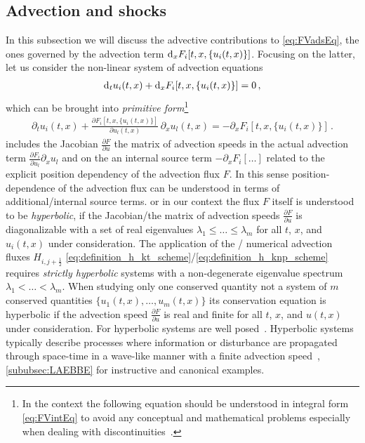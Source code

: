 \subsection{Advection and shocks}\label{subsec:hydroAdvection}
In this subsection we will discuss the advective contributions to \cref{eq:FVadsEq}, \viz{} the ones governed by the advection term $\difx\! F_i [ t, x, \{u_i ( t, x )\} ]$.
Focusing on the latter, let us consider the non-linear system of advection equations
\begin{align}
	\dift\! u_i ( t, x )+\difx\!  F_i [ t, x, \{u_i ( t, x )\} ]=0\,,\label{eq:FVadsEqFonly}
\end{align}
which can be brought into \textit{primitive form}\footnote{
	In the \fv{} context the following equation should be understood in integral form \eqref{eq:FVintEq} to avoid any conceptual and mathematical problems especially when dealing with discontinuities~\cite{LeVeque:2002,RezzollaZanotti:2013,Vazquez-Cendon2015}.
}
\begin{align}
	\partial_t u_i ( t, x )+\frac{\partial F_i[ t, x, \{u_i ( t, x )\} ]}{\partial u_l(t,x)}\,\partial_x u_l ( t, x ) = -\partial_x F_i [ t, x, \{u_i ( t, x )\} ] \,.\label{eq:FVFprimitive}
\end{align}
 includes the Jacobian $\frac{\partial F}{\partial u}$ \dash{} the matrix of advection speeds \dash{} in the actual advection term $\frac{\partial F_i}{\partial u_l}\partial_x u_l$ and on the \rhs{} an internal source term $-\partial_x F_i[\ldots]$ related to the explicit position dependency of the advection flux $F$.
In this sense position-dependence of the advection flux can be understood in terms of additional/internal source terms.
 or in our context the flux $F$ itself is understood to be \textit{hyperbolic}, if the Jacobian/the matrix of advection speeds $\frac{\partial F}{\partial u}$ is diagonalizable with a set of real eigenvalues $\lambda_1 \le \ldots \le \lambda_m$ for all $t$, $x$, and $u_i ( t, x )$ under consideration.
The application of the \kt{}/\knp{} numerical advection fluxes $H_{i,j + \frac{1}{2}}$ \eqref{eq:definition_h_kt_scheme}/\eqref{eq:definition_h_knp_scheme} requires \textit{strictly hyperbolic} systems with a non-degenerate eigenvalue spectrum $\lambda_1 < \ldots < \lambda_m$.
When studying only one conserved quantity \dash{} not a system of $m$ conserved quantities $\{u_1 ( t, x ),\ldots,u_m ( t, x )\}$ \dash{} its conservation equation is hyperbolic if the advection speed $\frac{\partial F}{\partial u}$ is real and finite for all $t$, $x$, and $u( t, x )$ under consideration.
For hyperbolic systems \ivps{} are well posed~\cite{LeVeque:2002,RezzollaZanotti:2013,Vazquez-Cendon2015}.
Hyperbolic systems typically describe processes where information or disturbance are propagated through space-time in a wave-like manner with a finite advection speed~\cite{LeVeque:1992,LeVeque:2002,Hesthaven2007,Vazquez-Cendon2015,polyanin2016handbook}, \cf{} \cref{sububsec:LAEBBE} for instructive and canonical examples.

